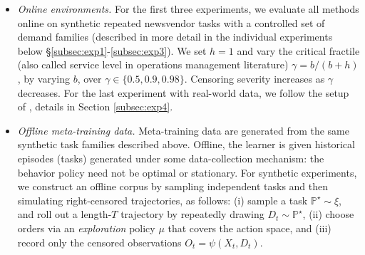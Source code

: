 \documentclass[11pt]{article}
\renewcommand{\P}{\mathbb{P}}
\begin{document}
\begin{itemize}[leftmargin=*]
\item 
\emph{Online environments.}
For the first three experiments, we evaluate all methods online on synthetic repeated newsvendor tasks with a
controlled set of demand families (described in more detail in the individual experiments below \S\ref{subsec:exp1}-\ref{subsec:exp3}). We set $h=1$ and vary the critical fractile (also called service level in operations management literature) $\gamma=b/(b+h)$, by varying $b$, over $\gamma\in\{0.5,0.9,0.98\}$. Censoring severity increases as $\gamma$ decreases. For the last experiment with real-world data, we follow the setup of \citealt{hssaine2024censored}, details in Section \ref{subsec:exp4}.
\item 
\emph{Offline meta-training data.}
Meta-training data are generated from the same synthetic task families described above. Offline, the learner is given historical episodes (tasks) generated under some data-collection mechanism: the behavior policy need not be optimal or stationary. For synthetic experiments, we construct an offline corpus by sampling independent tasks and then simulating right-censored trajectories, as follows: (i) sample a task $\P^\star \sim \xi$, and roll out a length-$T$ trajectory by repeatedly drawing $D_t \sim \P^\star$, (ii) choose orders via an \emph{exploration} policy $\mu$ that covers the action space, and (iii) record only the censored observations $O_t=\psi(X_t,D_t)$.
\end{itemize}
\end{document}
